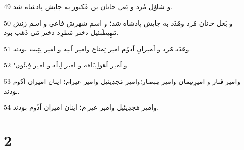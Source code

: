 \par 49 و شاؤل مُرد و بَعل حانان بن عَکبور به جايش پادشاه شد.
\par 50 و بَعل حانان مُرد وهَدَد به جايش پادشاه شد؛ و اسم شهرش فاعي و اسم زنش مَهِيطَبئيل دختر مَطرِد دختر مَي ذَهَب بود.
\par 51 وهَدَد مُرد و اَميرانِ اَدوُم امير تِمناع وامير اَليه و امير يتِيت بودند.
\par 52 و اَمير اَهولِيبَامَه و امير اِيلَه و امير فِينُون؛
\par 53 وامير قَناز و اميرِتيمان وامير مِبصار؛وامير مَجدِيئيل وامير عيرام؛ اينان اميران اَدُوم بودند.
\par 54 وامير مَجدِيئيل وامير عيرام؛ اينان اميران اَدُوم بودند.
 
\chapter{2}

